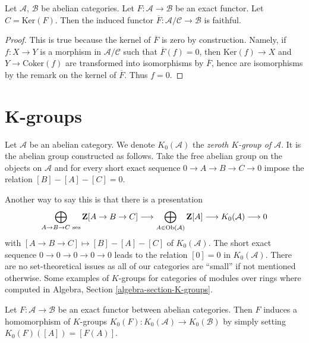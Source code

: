 \begin{lemma}
\label{lemma-quotient-by-kernel-exact-functor}
Let $\mathcal{A}$, $\mathcal{B}$ be abelian categories.
Let $F : \mathcal{A} \to \mathcal{B}$ be an exact functor.
Let $C = \text{Ker}(F)$. Then the induced functor
$\overline{F} : \mathcal{A}/\mathcal{C} \to \mathcal{B}$ is
faithful.
\end{lemma}

\begin{proof}
This is true because the kernel of $\overline{F}$ is zero by
construction. Namely, if $f : X \to Y$ is a morphism in
$\mathcal{A}/\mathcal{C}$ such that $\overline{F}(f) = 0$, then
$\text{Ker}(f) \to X$ and $Y \to \text{Coker}(f)$ are transformed
into isomorphisms by $\overline{F}$, hence are isomorphisms by the
remark on the kernel of $\overline{F}$. Thus $f = 0$.
\end{proof}






\section{K-groups}
\label{section-K-groups}

\begin{definition}
\label{definition-K-zero}
Let $\mathcal{A}$ be an abelian category.
We denote $K_0(\mathcal{A})$ the
{\it zeroth $K$-group of $\mathcal{A}$}.
It is the abelian group constructed as follows.
Take the free abelian group
on the objects on $\mathcal{A}$
and for every short exact sequence
$0 \to A \to B \to C \to 0$
impose the relation $[B] - [A] - [C] = 0$.
\end{definition}

\noindent
Another way to say this is that there is a presentation
$$
\bigoplus_{A \to B \to C\text{ ses}}
\mathbf{Z}[A \to B \to C]
\longrightarrow
\bigoplus_{A \in \mathop{\rm Ob}\nolimits(\mathcal{A})}
\mathbf{Z}[A]
\longrightarrow
K_0(\mathcal{A})
\longrightarrow
0
$$
with $[A \to B \to C] \mapsto [B] - [A] - [C]$ of $K_0(\mathcal{A})$.
The short exact sequence $0 \to 0 \to 0 \to 0 \to 0$
leads to the relation $[0] = 0$ in $K_0(\mathcal{A})$.
There are no set-theoretical issues as all of our categories
are ``small'' if not mentioned otherwise.
Some examples of $K$-groups for categories of modules
over rings where computed in
Algebra, Section \ref{algebra-section-K-groups}.

\begin{lemma}
\label{lemma-exact-functor-K-groups}
Let $F : \mathcal{A} \to \mathcal{B}$ be an exact functor between
abelian categories. Then $F$ induces a homomorphism of $K$-groups
$K_0(F) : K_0(\mathcal{A}) \to K_0(\mathcal{B})$ by simply setting
$K_0(F)([A]) = [F(A)]$.
\end{lemma}

